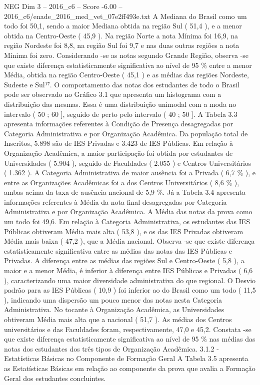 \begin{textsample}{NEG Dim 3 – 2016\_c6 – Score -6.00 – 2016\_c6/enade\_2016\_med\_vet\_07e2ff493e.txt}
A Mediana do Brasil como um todo foi 50,1, sendo a maior Mediana obtida na região Sul ( 51,4 ), e a menor obtida na Centro-Oeste ( 45,9 ).
Na região Norte a nota Mínima foi 16,9, na região Nordeste foi 8,8, na região Sul foi 9,7 e nas duas outras regiões a nota Mínima foi zero.
Considerando -se as notas segundo Grande Região, observa -se que existe diferença estatisticamente significativa ao nível de 95 \% entre a menor Média, obtida na região Centro-Oeste ( 45,1 ) e as médias das regiões Nordeste, Sudeste e Sul¹⁷.
O comportamento das notas dos estudantes de todo o Brasil pode ser observado no Gráfico 3.1 que apresenta um histograma com a distribuição das mesmas.
Essa é uma distribuição unimodal com a moda no intervalo ( 50 ; 60 ], seguido de perto pelo intervalo ( 40 ; 50 ].
A Tabela 3.3 apresenta informações referentes à Condição de Presença desagregadas por Categoria Administrativa e por Organização Acadêmica.
Da população total de Inscritos, 5.898 são de IES Privadas e 3.423 de IES Públicas.
Em relação à Organização Acadêmica, a maior participação foi obtida por estudantes de Universidades ( 5.904 ), seguido de Faculdades ( 2.055 ) e Centros Universitários ( 1.362 ).
A Categoria Administrativa de maior ausência foi a Privada ( 6,7 \% ), e entre as Organizações Acadêmicas foi a dos Centros Universitários ( 8,6 \% ), ambas acima da taxa de ausência nacional de 5,9 \%.
Já a Tabela 3.4 apresenta informações referentes à Média da nota final desagregadas por Categoria Administrativa e por Organização Acadêmica.
A Média das notas da prova como um todo foi 49,6.
Em relação à Categoria Administrativa, os estudantes das IES Públicas obtiveram Média mais alta ( 53,8 ), e os das IES Privadas obtiveram Média mais baixa ( 47,2 ), que a Média nacional.
Observa -se que existe diferença estatisticamente significativa entre as médias das notas das IES Públicas e Privadas.
A diferença entre as médias das regiões Sul e Centro-Oeste ( 5,8 ), a maior e a menor Média, é inferior à diferença entre IES Públicas e Privadas ( 6,6 ), caracterizando uma maior diversidade administrativa do que regional.
O Desvio padrão para as IES Públicas ( 10,9 ) foi inferior ao do Brasil como um todo ( 11,5 ), indicando uma dispersão um pouco menor das notas nesta Categoria Administrativa.
No tocante à Organização Acadêmica, as Universidades obtiveram Média mais alta que a nacional ( 51,7 ).
As médias dos Centros universitários e das Faculdades foram, respectivamente, 47,0 e 45,2.
Constata -se que existe diferença estatisticamente significativa ao nível de 95 \% nas médias das notas dos estudantes dos três tipos de Organização Acadêmica. 3.1.2 - Estatísticas Básicas no Componente de Formação Geral A Tabela 3.5 apresenta as Estatísticas Básicas em relação ao componente da prova que avalia a Formação Geral dos estudantes concluintes.

\end{textsample}
